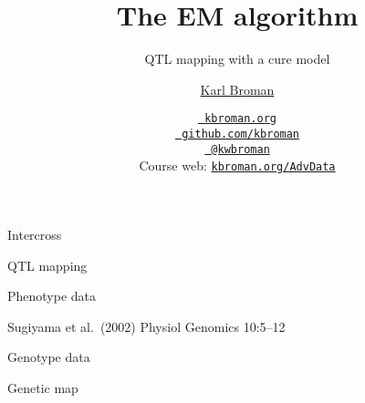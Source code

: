 \documentclass[aspectratio=169,12pt,t]{beamer}
\title{The EM algorithm}
\subtitle{QTL mapping with a cure model}
\author{\href{https://kbroman.org}{Karl Broman}}
\institute{Biostatistics \& Medical Informatics, UW{\textendash}Madison}
\date{\href{https://kbroman.org}{\tt \scriptsize \color{foreground} kbroman.org}
\\[-4pt]
\href{https://github.com/kbroman}{\tt \scriptsize \color{foreground} github.com/kbroman}
\\[-4pt]
\href{https://twitter.com/kwbroman}{\tt \scriptsize \color{foreground} @kwbroman}
\\[-4pt]
{\scriptsize Course web: \href{https://kbroman.org/AdvData}{\tt kbroman.org/AdvData}}
}
\begin{document}
{
\frame{
  \titlepage

  \note{}

} }



\begin{frame}[c]{Intercross}
\end{frame}





\begin{frame}[c]{QTL mapping}

\vspace{5mm}
\end{frame}




\begin{frame}[c]{Phenotype data}

\vspace{5mm}

{\lolit \footnotesize
Sugiyama et al.\ (2002) Physiol Genomics 10:5--12
}
\end{frame}


\begin{frame}[c]{Genotype data}
\end{frame}


\begin{frame}[c]{Genetic map}
\end{frame}
\end{document}
